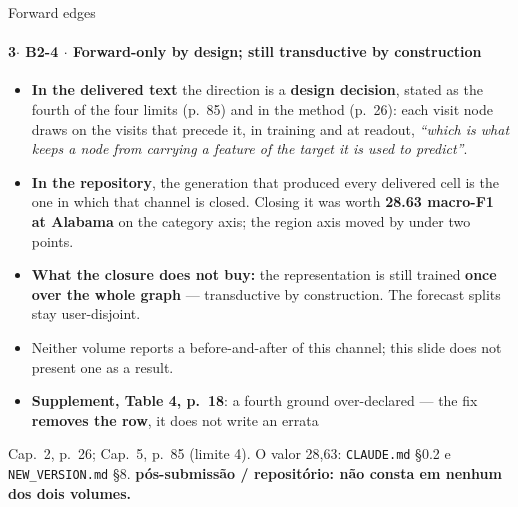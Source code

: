 \documentclass{beamer}
\begin{document}
\begin{frame}[noframenumbering]{Forward edges}
    \framesubtitle{\normalsize 3$\cdot$ \textbf{B2-4} $\cdot$ Forward-only by design; still transductive by construction}
    \hypertarget{b24}{}
    \hypertarget{bq15}{}%
    \small\begin{itemize}\setlength{\itemsep}{0pt}\setlength{\parskip}{0pt}
        \item \textbf{In the delivered text} the direction is a \textbf{design decision}, stated as the fourth of the four limits (p.~85) and in the method (p.~26): each visit node draws on the visits that precede it, in training and at readout, \textit{``which is what keeps a node from carrying a feature of the target it is used to predict''}.
        \item \textbf{In the repository}, the generation that produced every delivered cell is the one in which that channel is closed. Closing it was worth \textbf{28.63 macro-F1 at Alabama} on the category axis; the region axis moved by under two points.
        \item \textbf{What the closure does not buy:} the representation is still trained \textbf{once over the whole graph} --- transductive by construction. The forecast splits stay user-disjoint.
        \item Neither volume reports a before-and-after of this channel; this slide does not present one as a result.
        \item \textbf{Supplement, Table 4, p.~18}: a fourth ground over-declared --- the fix \textbf{removes the row}, it does not write an errata
    \end{itemize}
    \vfill
    {\scriptsize
    \begin{minipage}[b]{0.775\linewidth}\raggedright\textcolor{black!70}{Cap.~2, p.~26; Cap.~5, p.~85 (limite 4). O valor 28,63: \texttt{CLAUDE.md} §0.2 e \texttt{NEW\_VERSION.md} §8. \textbf{pós-submissão / repositório: não consta em nenhum dos dois volumes.}}\end{minipage}\hfill
    \begin{minipage}[b]{0.20\linewidth}\raggedleft \hyperlink{b0}{}\end{minipage}}
\end{frame}
\end{document}

